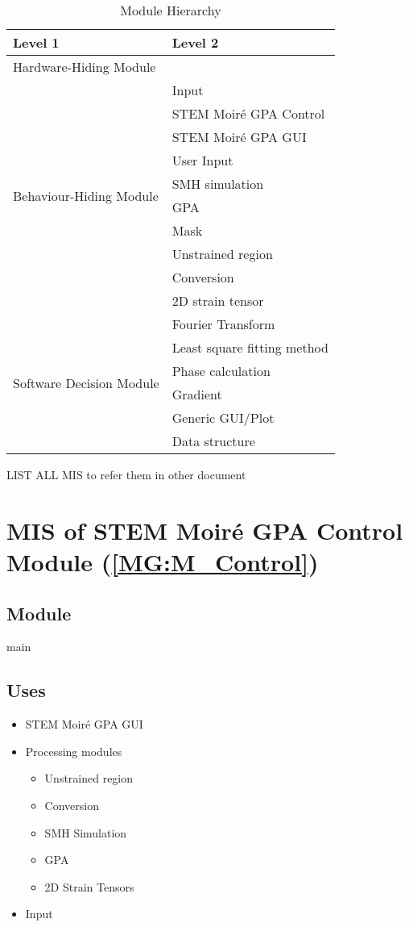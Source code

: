 \documentclass[12pt, titlepage]{article}
\newcommand{\progname}{STEM Moir{\'e} GPA}
\begin{document}
\begin{table}[H]
\centering
\begin{tabular}{p{} p{}}
\toprule
\textbf{Level 1} & \textbf{Level 2}\\
\midrule

{Hardware-Hiding Module} & ~ \\
\midrule

\multirow{10}{0.3\textwidth}{Behaviour-Hiding Module} & Input\\
& \progname{} Control \\
& \progname{} GUI \\
& User Input \\
& SMH simulation \\
& GPA \\
& Mask \\
& Unstrained region \\
& Conversion \\
& 2D strain tensor \\
\midrule

\multirow{6}{0.3\textwidth}{Software Decision Module} & Fourier Transform \\
& Least square fitting method \\
& Phase calculation \\
& Gradient \\
& Generic GUI/Plot \\
& Data structure \\
\bottomrule

\end{tabular}
\caption{Module Hierarchy}
\label{TblMH}
\end{table}

LIST ALL MIS to refer them in other document

\newpage


\section{MIS of STEM Moir{\'e} GPA Control Module (\texorpdfstring{\cref{MG:M_Control}}))} \label{MIS_Control}

\subsection{Module}
main
\subsection{Uses}
\begin{itemize}
\item STEM Moir{\'e} GPA GUI
\item Processing modules \begin{itemize}
	\item Unstrained region 
	\item Conversion
	\item SMH Simulation
	\item GPA
	\item 2D Strain Tensors
\end{itemize}
\item Input
\end{itemize}
\end{document}
